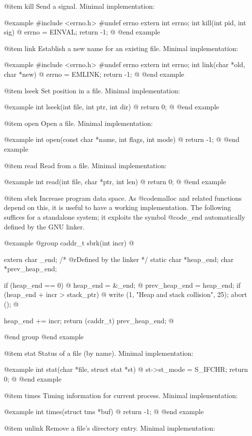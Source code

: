@item kill
Send a signal.  Minimal implementation:

@example
#include <errno.h>
#undef errno
extern int errno;
int kill(int pid, int sig) @{
  errno = EINVAL;
  return -1;
@}
@end example

@item link
Establish a new name for an existing file.  Minimal implementation:

@example
#include <errno.h>
#undef errno
extern int errno;
int link(char *old, char *new) @{
  errno = EMLINK;
  return -1;
@}
@end example

@item lseek
Set position in a file.  Minimal implementation:

@example
int lseek(int file, int ptr, int dir) @{
  return 0;
@}
@end example

@item open
Open a file.  Minimal implementation:

@example
int open(const char *name, int flags, int mode) @{
  return -1;
@}
@end example

@item read
Read from a file.  Minimal implementation:

@example
int read(int file, char *ptr, int len) @{
  return 0;
@}
@end example

@item sbrk
Increase program data space.  As @code{malloc} and related functions
depend on this, it is useful to have a working implementation.  The
following suffices for a standalone system; it exploits the symbol
@code{_end} automatically defined by the GNU linker.

@example
@group
caddr_t sbrk(int incr) @{
  extern char _end;		/* @r{Defined by the linker} */
  static char *heap_end;
  char *prev_heap_end;
 
  if (heap_end == 0) @{
    heap_end = &_end;
  @}
  prev_heap_end = heap_end;
  if (heap_end + incr > stack_ptr) @{
    write (1, "Heap and stack collision\n", 25);
    abort ();
  @}

  heap_end += incr;
  return (caddr_t) prev_heap_end;
@}
@end group
@end example

@item stat
Status of a file (by name).  Minimal implementation:

@example
int stat(char *file, struct stat *st) @{
  st->st_mode = S_IFCHR;
  return 0;
@}
@end example

@item times
Timing information for current process.  Minimal implementation:

@example
int times(struct tms *buf) @{
  return -1;
@}
@end example

@item unlink
Remove a file's directory entry.  Minimal implementation:


